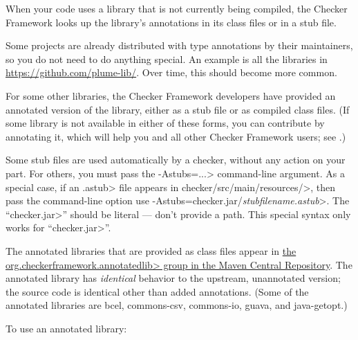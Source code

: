 When your code uses a library that is not currently being compiled, the
Checker Framework looks up the library's annotations in its class files or
in a stub file.

Some projects are already distributed with type annotations by their
maintainers, so you do not need to do anything special.
An example is all the libraries in \url{https://github.com/plume-lib/}.
Over time, this should become more common.

For some other libraries, the Checker Framework developers have provided an
annotated version of the library, either as a stub file or as compiled class files.
(If some library is not available in either of these forms,
you can contribute by annotating it, which will
help you and all other Checker Framework users; see
.)

Some stub files are used automatically by a checker, without any action on
your part.  For others, you must pass the \<-Astubs=...> command-line argument.
As a special case, if an \<.astub> file appears in
\<checker/src/main/resources/>, then pass the command-line option
use \<-Astubs=checker.jar/\emph{stubfilename.astub}>.
The ``\<checker.jar>'' should be literal --- don't provide a path.
This special syntax only works for ``\<checker.jar>''.

The annotated libraries that are provided as class files appear in
\href{https://search.maven.org/search?q=org.checkerframework.annotatedlib}{the
  \<org.checkerframework.annotatedlib> group in the Maven Central Repository}.
The annotated library has \emph{identical} behavior to the upstream,
unannotated version; the source code is identical other than added
annotations.
%
(Some of the annotated libraries are
bcel,
commons-csv,
commons-io,
guava,
and
java-getopt.)

To use an annotated library:

